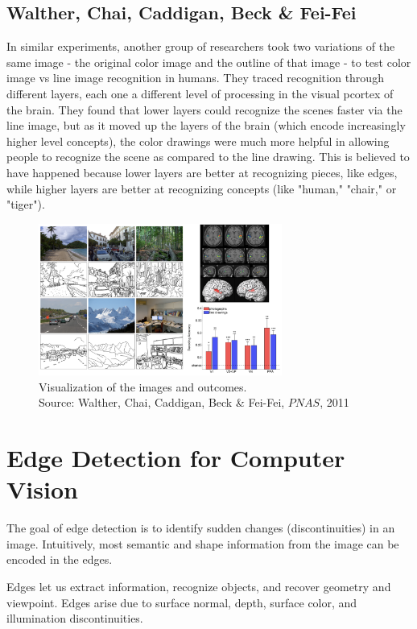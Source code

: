 \documentclass{article}
\begin{document}
\subsection{Walther, Chai, Caddigan, Beck \& Fei-Fei}
In similar experiments, another group of researchers took two variations of the same image - the original color image and the outline of that image - to test color image vs line image recognition in humans. They traced recognition through different layers, each one a different level of processing in the visual pcortex of the brain. They found that lower layers could recognize the scenes faster via the line image, but as it moved up the layers of the brain (which encode increasingly higher level concepts), the color drawings were much more helpful in allowing people to recognize the scene as compared to the line drawing. This is believed to have happened because lower layers are better at recognizing pieces, like edges, while higher layers are better at recognizing concepts (like "human," "chair," or "tiger").

\begin{figure}[H]
\caption{Visualization of the images and outcomes. \\
Source: Walther, Chai, Caddigan, Beck \& Fei-Fei, $PNAS$, 2011}
\centering
\includegraphics[width=8cm]{fei-fei_images.png}
\end{figure}



\section{Edge Detection for Computer Vision}
The goal of edge detection is to identify sudden changes (discontinuities) in an image. Intuitively, most semantic and shape information from the image can be encoded in the edges. \newline

Edges let us extract information, recognize objects, and recover geometry and viewpoint. Edges arise due to surface normal, depth, surface color, and illumination discontinuities. \newline
\end{document}
